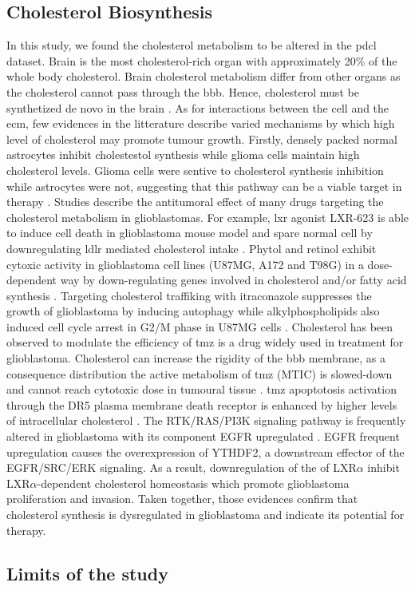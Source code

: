 \subsection{Cholesterol Biosynthesis}

In this study, we found the cholesterol metabolism to be altered in the \acrshort{pdcl} dataset.
Brain is the most cholesterol-rich organ with approximately 20\% of the whole body cholesterol.
Brain cholesterol metabolism differ from other organs as the cholesterol cannot pass through the \acrfull{bbb}.
Hence, cholesterol must be synthetized de novo in the brain \cite*{Villa2016,Yamamoto2018,Pirmoradi2019}.
As for interactions between the cell and the \acrlong{ecm}, few evidences in the litterature describe varied mechanisms by which high level of cholesterol may promote tumour growth.
Firstly, densely packed normal astrocytes inhibit cholestestol synthesis while glioma cells maintain high cholesterol levels.
Glioma cells were sentive to cholesterol synthesis inhibition while astrocytes were not, suggesting that this pathway can be a viable target in therapy \cite*{Kambach2017}.
Studies describe the antitumoral effect of many drugs targeting the cholesterol metabolism in glioblastomas.
For example, \acrfull{lxr} agonist LXR-623 is able to induce cell death in glioblastoma mouse model and spare normal cell by downregulating \acrfull{ldlr} mediated cholesterol intake \cite*{Villa2016, Pirmoradi2019}.
Phytol and retinol exhibit cytoxic activity in glioblastoma cell lines (U87MG, A172 and T98G) in a dose-dependent way by down-regulating genes involved in cholesterol and/or fatty acid synthesis \cite*{Facchini2018}.
Targeting cholesterol traffiking with itraconazole suppresses the growth of glioblastoma by inducing autophagy \cite*{Liu2014} while alkylphospholipids also induced cell cycle arrest in G2/M phase in U87MG cells \cite*{Rios-Marco2013}.
Cholesterol has been observed to modulate the efficiency of \acrfull{tmz} is a drug widely used in treatment for glioblastoma.
Cholesterol can increase the rigidity of the \acrshort{bbb} membrane, as a consequence distribution the active metabolism of \acrshort{tmz} (MTIC) is slowed-down and cannot reach cytotoxic dose in tumoural tissue \cite*{Ramalho2019}.
\acrshort{tmz} apoptotosis activation through the DR5 plasma membrane death receptor is enhanced by higher levels of intracellular cholesterol \cite*{Yamamoto2018}.
The RTK/RAS/PI3K signaling pathway is frequently altered in glioblastoma with its component EGFR upregulated \cite*{McLendon2008}.
EGFR frequent upregulation causes the overexpression of YTHDF2, a downstream effector of the EGFR/SRC/ERK signaling.
As a result, downregulation of the of LXR$\alpha$ inhibit LXR$\alpha$-dependent cholesterol homeostasis which promote glioblastoma proliferation and invasion. 
Taken together, those evidences confirm that cholesterol synthesis is dysregulated in glioblastoma and indicate its potential for therapy.

\subsection{Limits of the study}

